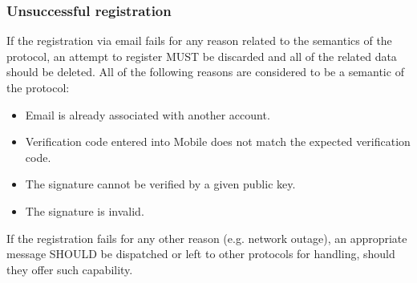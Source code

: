             \subsubsection{Unsuccessful registration}
            If the registration via email fails for any reason related to the semantics of the protocol, an attempt to
            register MUST be discarded and all of the related data should be deleted. All of the following reasons are 
            considered to be a semantic of the protocol:
            \begin{itemize}
                  \item Email is already associated with another account.
                  \item Verification code entered into Mobile does not match the expected verification code.
                  \item The signature cannot be verified by a given public key.
                  \item The signature is invalid.
            \end{itemize}
            If the registration fails for any other reason (e.g. network outage), an appropriate message SHOULD be
            dispatched or left to other protocols for handling, should they offer such capability.

